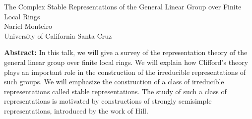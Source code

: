 \documentclass[12pt,a4paper]{article}
\begin{document}
\thispagestyle{empty} 
\begin{center}
{\large  The Complex Stable Representations of the General Linear Group over Finite Local Rings}\\
\vspace*{.5cm}
Nariel Monteiro\\
University of California Santa Cruz\\
\end{center}
\vspace*{.8cm}

{\bf Abstract:}  In this talk, we will give a survey of the representation theory of the general linear group over finite local rings. We will explain how Clifford's theory plays an important role in the construction of the irreducible representations of such groups. We will emphasize the construction of a class of irreducible representations called stable representations. The study of such a class of representations is motivated by constructions of strongly semisimple representations, introduced by the work of Hill.
\end{document}
